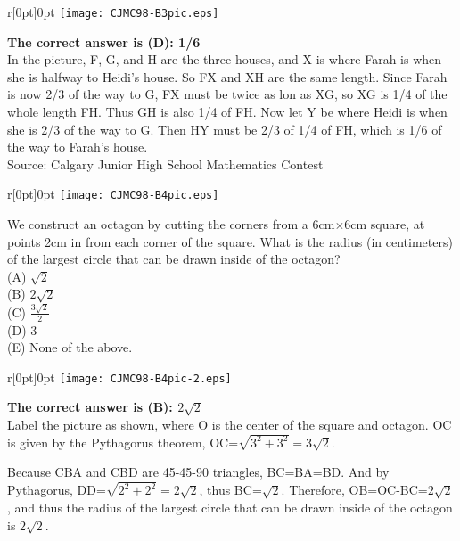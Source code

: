 \documentclass{article}
\begin{document}
\begin{wrapfigure}{r}[0pt]{0pt}
	\texttt{[image: CJMC98-B3pic.eps]}
\end{wrapfigure}

\textbf{The correct answer is (D): 1/6}\\[1 ex]
In the picture, F, G, and H are the three houses, and X is where Farah is when she is halfway to Heidi's house. So FX and XH are the same length. Since Farah is now 2/3 of the way to G, FX must be twice as lon as XG, so XG is 1/4 of the whole length FH. Thus GH is also 1/4 of FH. Now let Y be where Heidi is when she is 2/3 of the way to G. Then HY must be 2/3 of 1/4 of FH, which is 1/6 of the way to Farah's house.
\\[5 ex]%

\scriptsize
Source: Calgary Junior High School Mathematics Contest

\normalsize
\begin{wrapfigure}[4]{r}[0pt]{0pt}
	\texttt{[image: CJMC98-B4pic.eps]}
\end{wrapfigure}
We construct an octagon by cutting the corners from a 6cm$\times$6cm square, at points 2cm in from each corner of the square. What is the radius (in centimeters) of the largest circle that can be drawn inside of the octagon?\\
(A) $\sqrt{2}$\\
(B) $2\sqrt{2}$\\
(C) $\frac{3\sqrt{2}}{2}$\\
(D) 3\\
(E) None of the above.\\

\begin{wrapfigure}{r}[0pt]{0pt}
	\texttt{[image: CJMC98-B4pic-2.eps]}
\end{wrapfigure}

\textbf{The correct answer is (B): $2\sqrt{2}$}\\[1 ex]
Label the picture as shown, where O is the center of the square and octagon. OC is given by the Pythagorus theorem, OC=$\sqrt{3^2+3^2}=3\sqrt{2}$. 

Because CBA and CBD are 45-45-90 triangles, BC=BA=BD. And by Pythagorus, DD=$\sqrt{2^2+2^2}=2\sqrt{2}$, thus BC=$\sqrt{2}$. Therefore, OB=OC-BC=$2\sqrt{2}$, and thus the radius of the largest circle that can be drawn inside of the octagon is $2\sqrt{2}$.
\\[5 ex]%
\end{document}
